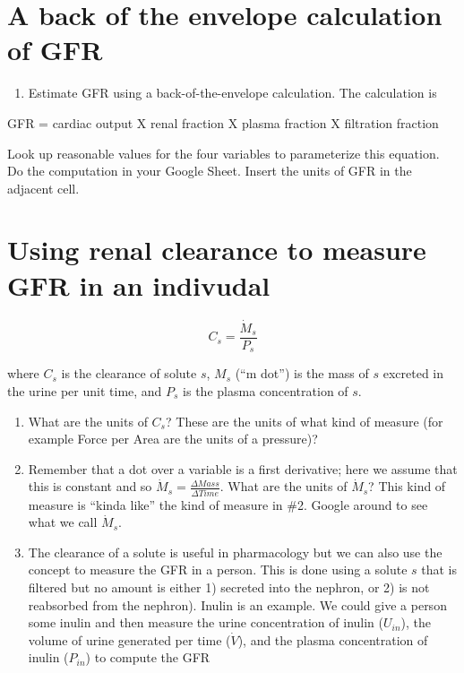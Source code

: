 \documentclass[]{book}
\providecommand{\tightlist}{%
  \setlength{\itemsep}{0pt}\setlength{\parskip}{0pt}}
\begin{document}
\section{A back of the envelope calculation of
GFR}\label{a-back-of-the-envelope-calculation-of-gfr}

\begin{enumerate}
\def\labelenumi{\arabic{enumi}.}
\tightlist
\item
  Estimate GFR using a back-of-the-envelope calculation. The calculation
  is
\end{enumerate}

GFR = cardiac output X renal fraction X plasma fraction X filtration
fraction

Look up reasonable values for the four variables to parameterize this
equation. Do the computation in your Google Sheet. Insert the units of
GFR in the adjacent cell.

\section{Using renal clearance to measure GFR in an
indivudal}\label{using-renal-clearance-to-measure-gfr-in-an-indivudal}

\begin{equation}
C_s = \frac{\dot{M}_s}{P_s}
\end{equation}

where \(C_s\) is the clearance of solute \(s\), \(M_s\) (``m dot'') is
the mass of \(s\) excreted in the urine per unit time, and \(P_s\) is
the plasma concentration of \(s\).

\begin{enumerate}
\def\labelenumi{\arabic{enumi}.}
\setcounter{enumi}{1}
\item
  What are the units of \(C_s\)? These are the units of what kind of
  measure (for example Force per Area are the units of a pressure)?
\item
  Remember that a dot over a variable is a first derivative; here we
  assume that this is constant and so
  \(\dot{M}_s = \frac{\Delta Mass}{\Delta Time}\). What are the units of
  \(\dot{M}_s\)? This kind of measure is ``kinda like'' the kind of
  measure in \#2. Google around to see what we call \(\dot{M}_s\).
\item
  The clearance of a solute is useful in pharmacology but we can also
  use the concept to measure the GFR in a person. This is done using a
  solute \(s\) that is filtered but no amount is either 1) secreted into
  the nephron, or 2) is not reabsorbed from the nephron). Inulin is an
  example. We could give a person some inulin and then measure the urine
  concentration of inulin (\(U_{in}\)), the volume of urine generated
  per time (\(\dot{V}\)), and the plasma concentration of inulin
  (\(P_{in}\)) to compute the GFR
\end{enumerate}
\end{document}
